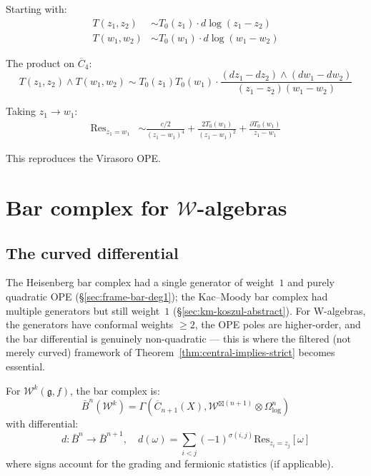 \begin{computation}
Starting with:
\begin{align}
T(z_1, z_2) &\sim T_0(z_1) \cdot d\log(z_1-z_2) \\
T(w_1, w_2) &\sim T_0(w_1) \cdot d\log(w_1-w_2)
\end{align}

The product on $\overline{C}_4$:
\begin{equation}
T(z_1,z_2) \wedge T(w_1,w_2) \sim T_0(z_1) T_0(w_1) \cdot \frac{(dz_1-dz_2) \wedge (dw_1-dw_2)}{(z_1-z_2)(w_1-w_2)}
\end{equation}

Taking $z_1 \to w_1$:
\begin{align}
\mathrm{Res}_{z_1=w_1} &\sim \frac{c/2}{(z_1-w_1)^4} + \frac{2T_0(w_1)}{(z_1-w_1)^2} + \frac{\partial T_0(w_1)}{z_1-w_1}
\end{align}

This reproduces the Virasoro OPE.
\end{computation}

\section{Bar complex for $\mathcal{W}$-algebras}

\subsection{The curved differential}

The Heisenberg bar complex had a single generator of weight~$1$ and purely quadratic OPE (\S\ref{sec:frame-bar-deg1}); the Kac--Moody bar complex had multiple generators but still weight~$1$ (\S\ref{sec:km-koszul-abstract}).  For W-algebras, the generators have conformal weights $\geq 2$, the OPE poles are higher-order, and the bar differential is genuinely non-quadratic --- this is where the filtered (not merely curved) framework of Theorem~\ref{thm:central-implies-strict} becomes essential.

\begin{definition}\label{def:w-bar-complex}
For $\mathcal{W}^k(\mathfrak{g}, f)$, the bar complex is:
\begin{equation}
\bar{B}^n(\mathcal{W}^k) = \Gamma\left(\overline{C}_{n+1}(X), \mathcal{W}^{\boxtimes (n+1)} \otimes \Omega^n_{\log}\right)
\end{equation}
with differential:
\begin{equation}
d: \bar{B}^n \to \bar{B}^{n+1}, \quad d(\omega) = \sum_{i<j} (-1)^{\sigma(i,j)} \mathrm{Res}_{z_i=z_j}[\omega]
\end{equation}
where signs account for the grading and fermionic statistics (if applicable).
\end{definition}

